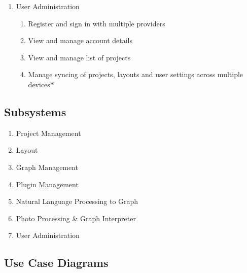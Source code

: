 \documentclass[11pt,a4paper]{article}
\begin{document}
\begin{enumerate}[label=\arabic*.]
    \item User Administration
    \begin{enumerate}[label*=\arabic*.]
	\item Register and sign in with multiple providers
	\item View and manage account details
	\item View and manage list of projects
	\item Manage syncing of projects, layouts and user settings across multiple
	devices\textbf{*}
    \end{enumerate}
\end{enumerate}

\subsection*{Subsystems}
\begin{enumerate}
    \item Project Management
    \item Layout
    \item Graph Management
    \item Plugin Management
    \item Natural Language Processing to Graph
    \item Photo Processing \& Graph Interpreter
    \item User Administration
\end{enumerate}

\pagebreak

\subsection*{Use Case Diagrams}
\end{document}
